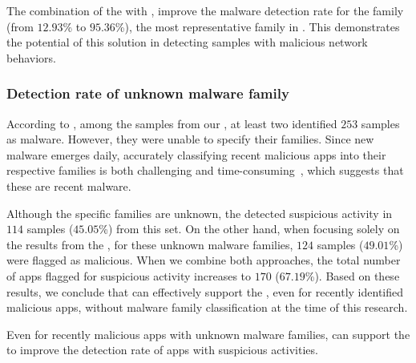 \begin{finding}

The combination of the \mas with \net, improve the malware detection rate for the \gps family (from $12.93$\% to $95.36$\%), the most representative family in \cds. This demonstrates the potential of this solution in detecting samples with malicious network behaviors.

\end{finding}


\subsubsection{Detection rate of unknown malware family}\label{sec:unknowfamily}

According to \vt, among the samples from our \cds, at least two \ses identified $253$ samples as malware. However, they were unable to specify their families. Since new malware emerges daily, accurately classifying recent malicious apps into their respective families is both challenging and time-consuming~\cite{DBLP:journals/compsec/WangTW21,DBLP:journals/compsec/ContiKP22}, which suggests that these are recent malware.

Although the specific families are unknown, the \mas detected suspicious activity in $114$ samples ($45.05$\%) from this set. On the other hand, when focusing solely on the results from the \net, for these unknown malware families, $124$ samples ($49.01$\%) were flagged as malicious. When we combine both approaches, the total number of apps flagged for suspicious activity increases to $170$ ($67.19$\%). Based on these results, we conclude that \net can effectively support the \mas, even for recently identified malicious apps, without malware family classification at the time of this research.

\begin{finding}

Even for recently malicious apps with unknown malware families, \net can support the \mas to improve the detection rate of apps with suspicious activities.

\end{finding}
